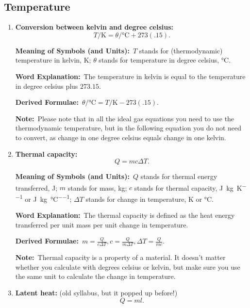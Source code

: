 \documentclass[8pt]{article}
\newcommand{\MeanSymb}{\textbf{Meaning of Symbols (and Units):}\ }
\newcommand{\WordExpl}{\textbf{Word Explanation:}\ }
\newcommand{\DeriForm}{\textbf{Derived Formulae:}\ }
\newcommand{\Note}{\textbf{Note:}\ }
\begin{document}
        \subsection{Temperature}
            \begin{enumerate}
                \item \textbf{Conversion between kelvin and degree celsius:}
                \[
                    T \unit{\per \kelvin} = \theta \unit{\per \degreeCelsius} + 273(.15).
                \]

                \MeanSymb \(T\) stands for (thermodynamic) temperature in kelvin, \unit{\kelvin}; \(\theta\) stands for temperature in degree celsius, \unit{\degreeCelsius}.

                \WordExpl The temperature in kelvin is equal to the temperature in degree celsius plus \(273.15\).

                \DeriForm \(\theta \unit{\per \degreeCelsius} = T \unit{\per \kelvin} - 273(.15)\).

                \Note Please note that in all the ideal gas equations you need to use the thermodynamic temperature, but in the following equation you do not need to convert, as change in one degree celsius equals change in one kelvin.

                \item \textbf{Thermal capacity:}
                \[
                    Q = m c \Delta T.
                \]

                \MeanSymb \(Q\) stands for thermal energy transferred, \unit{\joule}; \(m\) stands for mass, \unit{\kilogram}; \(c\) stands for thermal capacity, \unit{\joule \per \kilogram \per \kelvin} or \unit{\joule \per \kilogram \per \degreeCelsius}; \(\Delta T\) stands for change in temperature, \unit{\kelvin} or \unit{\degreeCelsius}.

                \WordExpl The thermal capacity is defined as the heat energy transferred per unit mass per unit change in temperature.

                \DeriForm \(m = \frac{Q}{c \Delta T}, c = \frac{Q}{m \Delta T}, \Delta T = \frac{Q}{mc}\).

                \Note Thermal capacity is a property of a material. It doesn't matter whether you calculate with degrees celsius or kelvin, but make sure you use the same unit to calculate the change in temperature.

                \item \textbf{Latent heat:} (old syllabus, but it popped up before!)
                \[
                    Q = ml.
                \]


\end{enumerate}
\end{document}

